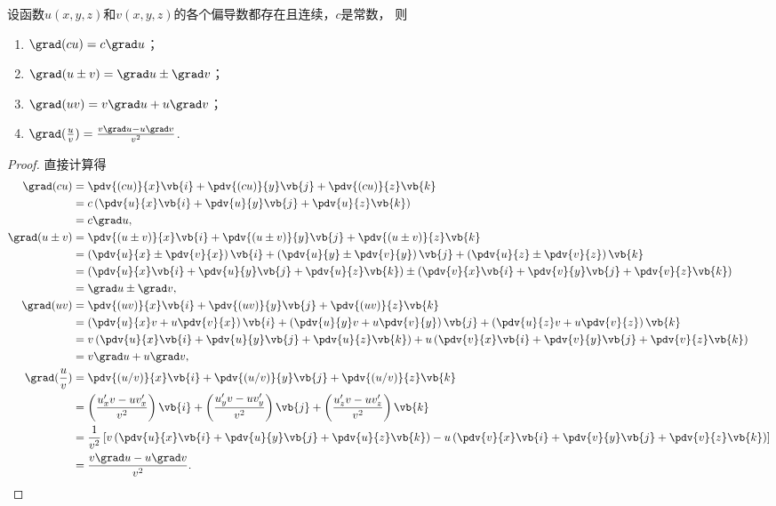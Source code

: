 \begin{theorem}\label{theorem:多元函数微分法.梯度的运算法则}
设函数\(u(x,y,z)\)和\(v(x,y,z)\)的各个偏导数都存在且连续，\(c\)是常数，
则\begin{enumerate}
	\item \(\grad(c u) = c \grad u\)；
	\item \(\grad(u \pm v) = \grad u \pm \grad v\)；
	\item \(\grad(uv) = v \grad u + u \grad v\)；
	\item \(\grad(\frac{u}{v}) = \frac{v \grad u - u \grad v}{v^2}\).
\end{enumerate}
\begin{proof}
\def\gradexpr#1{\pdv{#1}{x} \vb{i} + \pdv{#1}{y} \vb{j} + \pdv{#1}{z} \vb{k}}
直接计算得
\begin{align*}
	\grad(c u)
		&= \gradexpr{(cu)} \\
		&= c \left( \gradexpr{u} \right) \\
		&= c \grad u, \\
	\grad(u \pm v)
		&= \gradexpr{(u \pm v)} \\
		&= \left( \pdv{u}{x} \pm \pdv{v}{x} \right) \vb{i}
		+ \left( \pdv{u}{y} \pm \pdv{v}{y} \right) \vb{j}
		+ \left( \pdv{u}{z} \pm \pdv{v}{z} \right) \vb{k} \\
		&= \left( \gradexpr{u} \right) \pm \left( \gradexpr{v} \right) \\
		&= \grad u \pm \grad v, \\
	\grad(uv)
		&= \gradexpr{(uv)} \\
		&= \left( \pdv{u}{x} v + u \pdv{v}{x} \right) \vb{i}
		+ \left( \pdv{u}{y} v + u \pdv{v}{y} \right) \vb{j}
		+ \left( \pdv{u}{z} v + u \pdv{v}{z} \right) \vb{k} \\
		&= v \left( \gradexpr{u} \right)
		+ u \left( \gradexpr{v} \right) \\
		&= v \grad u + u \grad v, \\
	\grad(\frac{u}{v})
		&= \gradexpr{(u/v)} \\
		&= \left( \frac{u'_x v - u v'_x}{v^2} \right) \vb{i}
		+ \left( \frac{u'_y v - u v'_y}{v^2} \right) \vb{j}
		+ \left( \frac{u'_z v - u v'_z}{v^2} \right) \vb{k} \\
		&= \frac{1}{v^2} \left[
			v \left( \gradexpr{u} \right)
			- u \left( \gradexpr{v} \right)
		\right] \\
		&= \frac{v \grad u - u \grad v}{v^2}.
	\qedhere
\end{align*}
\end{proof}
\end{theorem}

